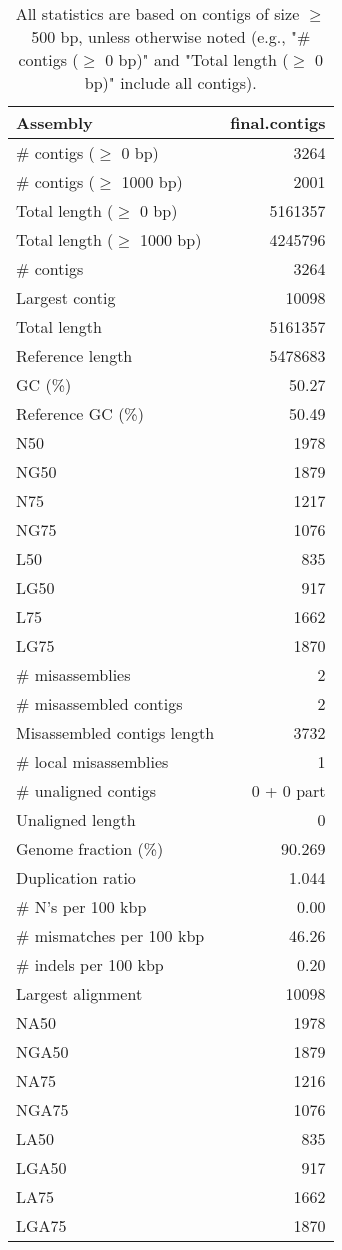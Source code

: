 \documentclass[12pt,a4paper]{article}
\begin{document}
\begin{table}[ht]
\begin{center}
\caption{All statistics are based on contigs of size $\geq$ 500 bp, unless otherwise noted (e.g., "\# contigs ($\geq$ 0 bp)" and "Total length ($\geq$ 0 bp)" include all contigs).}
\begin{tabular}{|l*{1}{|r}|}
\hline
Assembly & final.contigs \\ \hline
\# contigs ($\geq$ 0 bp) & 3264 \\ \hline
\# contigs ($\geq$ 1000 bp) & 2001 \\ \hline
Total length ($\geq$ 0 bp) & 5161357 \\ \hline
Total length ($\geq$ 1000 bp) & 4245796 \\ \hline
\# contigs & 3264 \\ \hline
Largest contig & 10098 \\ \hline
Total length & 5161357 \\ \hline
Reference length & 5478683 \\ \hline
GC (\%) & 50.27 \\ \hline
Reference GC (\%) & 50.49 \\ \hline
N50 & 1978 \\ \hline
NG50 & 1879 \\ \hline
N75 & 1217 \\ \hline
NG75 & 1076 \\ \hline
L50 & 835 \\ \hline
LG50 & 917 \\ \hline
L75 & 1662 \\ \hline
LG75 & 1870 \\ \hline
\# misassemblies & 2 \\ \hline
\# misassembled contigs & 2 \\ \hline
Misassembled contigs length & 3732 \\ \hline
\# local misassemblies & 1 \\ \hline
\# unaligned contigs & 0 + 0 part \\ \hline
Unaligned length & 0 \\ \hline
Genome fraction (\%) & 90.269 \\ \hline
Duplication ratio & 1.044 \\ \hline
\# N's per 100 kbp & 0.00 \\ \hline
\# mismatches per 100 kbp & 46.26 \\ \hline
\# indels per 100 kbp & 0.20 \\ \hline
Largest alignment & 10098 \\ \hline
NA50 & 1978 \\ \hline
NGA50 & 1879 \\ \hline
NA75 & 1216 \\ \hline
NGA75 & 1076 \\ \hline
LA50 & 835 \\ \hline
LGA50 & 917 \\ \hline
LA75 & 1662 \\ \hline
LGA75 & 1870 \\ \hline
\end{tabular}
\end{center}
\end{table}
\end{document}
